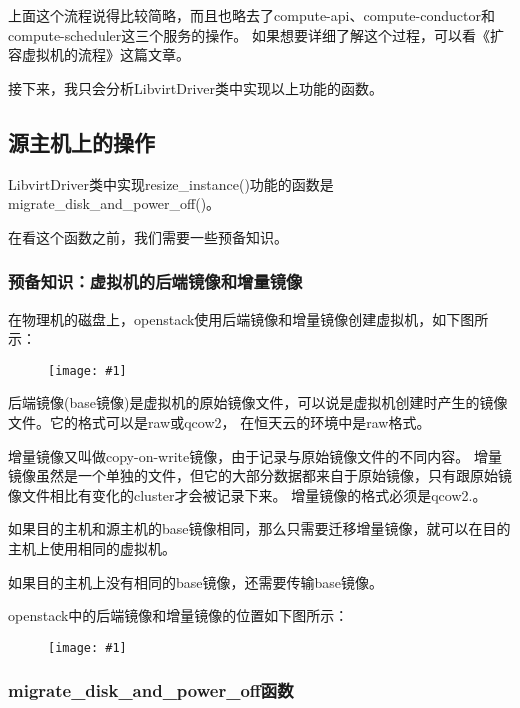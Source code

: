 \documentclass[a4paper,left=1.5cm,right=1.5cm,11pt]{article}
\newcommand{\fic}[1]{\begin{figure}[H]
		\center
		\texttt{[image: \#1]}
	\end{figure}}
\begin{document}
	上面这个流程说得比较简略，而且也略去了compute-api、compute-conductor和compute-scheduler这三个服务的操作。
	如果想要详细了解这个过程，可以看《扩容虚拟机的流程》这篇文章。\par

	接下来，我只会分析LibvirtDriver类中实现以上功能的函数。

\subsection{源主机上的操作}
	LibvirtDriver类中实现resize\_instance()功能的函数是migrate\_disk\_and\_power\_off()。\par

	在看这个函数之前，我们需要一些预备知识。

\subsubsection{预备知识：虚拟机的后端镜像和增量镜像}
	在物理机的磁盘上，openstack使用后端镜像和增量镜像创建虚拟机，如下图所示：
	\fic{4.png}

	后端镜像(base镜像)是虚拟机的原始镜像文件，可以说是虚拟机创建时产生的镜像文件。它的格式可以是raw或qcow2，
	在恒天云的环境中是raw格式。\par

	增量镜像又叫做copy-on-write镜像，由于记录与原始镜像文件的不同内容。
	增量镜像虽然是一个单独的文件，但它的大部分数据都来自于原始镜像，只有跟原始镜像文件相比有变化的cluster才会被记录下来。
	增量镜像的格式必须是qcow2.。\par

	如果目的主机和源主机的base镜像相同，那么只需要迁移增量镜像，就可以在目的主机上使用相同的虚拟机。\par

	如果目的主机上没有相同的base镜像，还需要传输base镜像。\par

	openstack中的后端镜像和增量镜像的位置如下图所示：
	\fic{5.png}

\subsubsection{migrate\_disk\_and\_power\_off函数}
\end{document}
